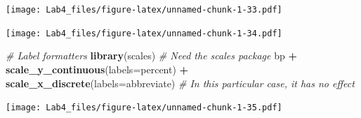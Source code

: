 \documentclass[]{article}
\newenvironment{Shaded}{\begin{snugshade}}{\end{snugshade}}
\newcommand{\KeywordTok}[1]{\textcolor[rgb]{0.13,0.29,0.53}{\textbf{#1}}}
\newcommand{\DataTypeTok}[1]{\textcolor[rgb]{0.13,0.29,0.53}{#1}}
\newcommand{\DecValTok}[1]{\textcolor[rgb]{0.00,0.00,0.81}{#1}}
\newcommand{\FloatTok}[1]{\textcolor[rgb]{0.00,0.00,0.81}{#1}}
\newcommand{\StringTok}[1]{\textcolor[rgb]{0.31,0.60,0.02}{#1}}
\newcommand{\CommentTok}[1]{\textcolor[rgb]{0.56,0.35,0.01}{\textit{#1}}}
\newcommand{\OperatorTok}[1]{\textcolor[rgb]{0.81,0.36,0.00}{\textbf{#1}}}
\newcommand{\NormalTok}[1]{#1}
\begin{document}
\texttt{[image: Lab4\_files/figure-latex/unnamed-chunk-1-33.pdf]}

\begin{Shaded}
\end{Shaded}

\texttt{[image: Lab4\_files/figure-latex/unnamed-chunk-1-34.pdf]}

\begin{Shaded}
\begin{Highlighting}[]
\CommentTok{# Label formatters}
\KeywordTok{library}\NormalTok{(scales)   }\CommentTok{# Need the scales package}
\NormalTok{bp }\OperatorTok{+}\StringTok{ }\KeywordTok{scale_y_continuous}\NormalTok{(}\DataTypeTok{labels=}\NormalTok{percent) }\OperatorTok{+}
\StringTok{     }\KeywordTok{scale_x_discrete}\NormalTok{(}\DataTypeTok{labels=}\NormalTok{abbreviate)  }\CommentTok{# In this particular case, it has no effect}
\end{Highlighting}
\end{Shaded}

\texttt{[image: Lab4\_files/figure-latex/unnamed-chunk-1-35.pdf]}
\end{document}
